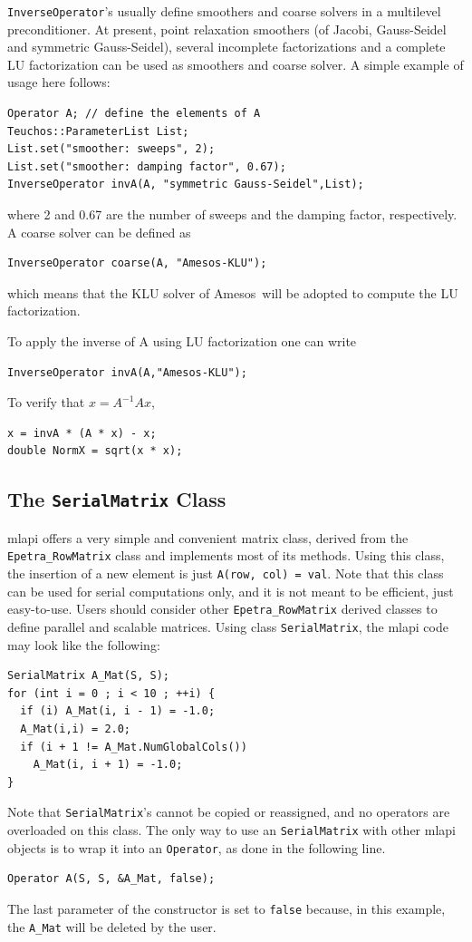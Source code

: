 \documentclass{article}[11pt]
\newcommand{\amesos}  {{\sc Amesos}}
\newcommand{\MLAPI}  {{\sc mlapi }}
\begin{document}
{\tt InverseOperator}'s usually define smoothers and coarse solvers in a
multilevel preconditioner. At present, point relaxation smoothers (of Jacobi,
Gauss-Seidel and symmetric Gauss-Seidel), several incomplete factorizations
and a complete LU factorization can be used as smoothers and coarse solver. A
simple example of usage here follows:
\begin{verbatim}
Operator A; // define the elements of A
Teuchos::ParameterList List;
List.set("smoother: sweeps", 2); 
List.set("smoother: damping factor", 0.67);
InverseOperator invA(A, "symmetric Gauss-Seidel",List);
\end{verbatim}
where 2 and 0.67 are the number of sweeps and the damping factor,
  respectively. A coarse solver can be defined as
\begin{verbatim}
InverseOperator coarse(A, "Amesos-KLU");
\end{verbatim}
which means that the KLU solver of \amesos\ will be adopted to compute the LU
factorization.

To apply the inverse of A using LU factorization one can write
\begin{verbatim}
InverseOperator invA(A,"Amesos-KLU");
\end{verbatim}
To verify that $x = A^{-1} A x$,
\begin{verbatim}
x = invA * (A * x) - x;
double NormX = sqrt(x * x);
\end{verbatim}

\subsection{The {\tt SerialMatrix} Class}
\label{sec:serialmatrix}

\MLAPI offers a very simple and convenient matrix class, derived from
 the \verb!Epetra_RowMatrix! class and implements most of its methods. 
 Using this class, the insertion of a new
 element is just \verb!A(row, col) = val!. Note that this class
can be used for serial computations only, and it is not meant to be efficient,
just easy-to-use. Users should consider
other \verb!Epetra_RowMatrix! derived classes
to define parallel and scalable matrices. Using class {\tt SerialMatrix}, the \MLAPI
code may look like the following:
\begin{verbatim}
SerialMatrix A_Mat(S, S);
for (int i = 0 ; i < 10 ; ++i) {
  if (i) A_Mat(i, i - 1) = -1.0;
  A_Mat(i,i) = 2.0;
  if (i + 1 != A_Mat.NumGlobalCols())
    A_Mat(i, i + 1) = -1.0;
}
\end{verbatim}
Note that {\tt SerialMatrix}'s cannot be copied or reassigned, and no
operators are overloaded on this class. The only way to use an
{\tt SerialMatrix} with other \MLAPI objects is to wrap it into an
{\tt Operator}, as done in the following line.
\begin{verbatim}
Operator A(S, S, &A_Mat, false);
\end{verbatim}
The last parameter of the constructor is set to {\tt false} because, in
this example, the
\verb!A_Mat! will be deleted by the user.
\end{document}
